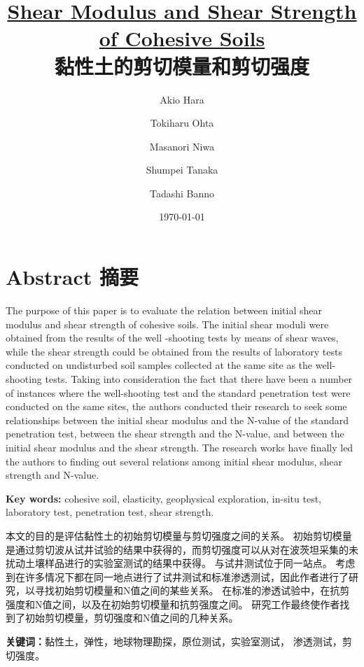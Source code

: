 \documentclass{myarticle}
\title{\textbf{\href{http://dx.doi.org/10.3208/sandf1972.14.3_1}{Shear Modulus and Shear Strength of Cohesive Soils}\\黏性土的剪切模量和剪切强度}}
\date{\today}
\author{Akio Hara \and Tokiharu Ohta \and Masanori Niwa \and Shumpei Tanaka \and Tadashi Banno}
\begin{document}
\maketitle

\section*{Abstract 摘要}

\begin{paracol}{2}

    The purpose of this paper is to evaluate the relation between initial shear modulus and shear strength of cohesive soils. The initial shear moduli were obtained from the results of the well -shooting tests by means of shear waves, while the shear strength could be obtained from the results of laboratory tests conducted on undisturbed soil samples collected at the same site as the well-shooting tests. Taking into consideration the fact that there have been a number of instances where the well-shooting test and the standard penetration test were conducted on the same sites, the authors conducted their research to seek some relationships between the initial shear modulus and the N-value of the standard penetration test, between the shear strength and the N-value, and between the initial shear modulus and the shear strength. The research works have finally led the authors to finding out several relations among initial shear modulus, shear strength and N-value.

    \textbf{Key words: }cohesive soil, elasticity, geophysical exploration, in-situ test, laboratory test, penetration test, shear strength.

    \switchcolumn

    本文的目的是评估黏性土的初始剪切模量与剪切强度之间的关系。 初始剪切模量是通过剪切波从试井试验的结果中获得的，而剪切强度可以从对在波茨坦采集的未扰动土壤样品进行的实验室测试的结果中获得。 与试井测试位于同一站点。 考虑到在许多情况下都在同一地点进行了试井测试和标准渗透测试，因此作者进行了研究，以寻找初始剪切模量和N值之间的某些关系。 在标准的渗透试验中，在抗剪强度和N值之间，以及在初始剪切模量和抗剪强度之间。 研究工作最终使作者找到了初始剪切模量，剪切强度和N值之间的几种关系。

    \textbf{关键词：}黏性土，弹性，地球物理勘探，原位测试，实验室测试， 渗透测试，剪切强度。

\end{paracol}










\end{document}
